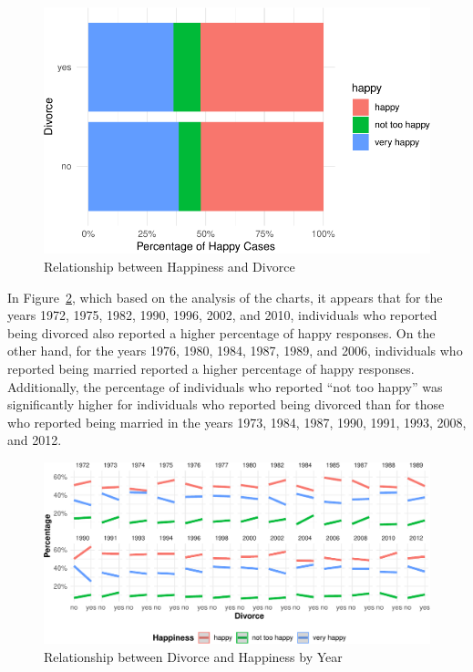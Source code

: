 \documentclass[
  letterpaper,
  DIV=11,
  numbers=noendperiod]{scrartcl}
\begin{document}
\begin{figure}

{\centering \includegraphics{paper_files/figure-pdf/fig-seven-1.pdf}

}

\caption{\label{fig-seven}Relationship between Happiness and Divorce}

\end{figure}

In Figure~\ref{fig-eight}, which based on the analysis of the charts, it
appears that for the years 1972, 1975, 1982, 1990, 1996, 2002, and 2010,
individuals who reported being divorced also reported a higher
percentage of happy responses. On the other hand, for the years 1976,
1980, 1984, 1987, 1989, and 2006, individuals who reported being married
reported a higher percentage of happy responses. Additionally, the
percentage of individuals who reported ``not too happy'' was
significantly higher for individuals who reported being divorced than
for those who reported being married in the years 1973, 1984, 1987,
1990, 1991, 1993, 2008, and 2012.

\begin{figure}

{\centering \includegraphics{paper_files/figure-pdf/fig-eight-1.pdf}

}

\caption{\label{fig-eight}Relationship between Divorce and Happiness by
Year}

\end{figure}
\end{document}
